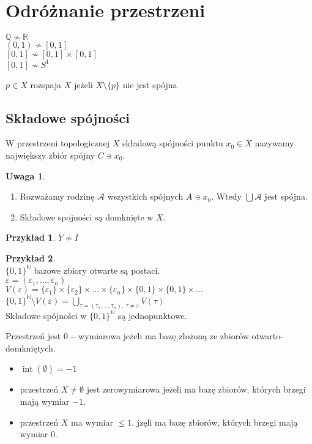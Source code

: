 \documentclass[twoside,10pt]{article}
\theoremstyle{definition}
\theoremstyle{definition}
\theoremstyle{definition}
\theoremstyle{definition}
\theoremstyle{remark}
\theoremstyle{definition}
\newtheorem*{uw}{Uwaga}
\theoremstyle{definition}
\theoremstyle{definition}
\theoremstyle{definition}
\newtheorem*{prz}{Przykład}
\theoremstyle{definition}
\theoremstyle{definition}
\begin{document}
\section{Odróżnanie przestrzeni} 
$\mathbb{Q} \nsim \mathbb{R}$ \\ 
$(0,1) \nsim [0,1]$ \\ 
$[0,1] \nsim [0,1] \times [0,1]$ \\ 
$[0,1] \nsim S^1$ 
\begin{df} 
    $p \in X$ rozspaja $X$ jeżeli $X \setminus \{p\}$ nie jest spójna 
\end{df} 
\subsection{Składowe spójności} 
\begin{df} 
    W przestrzeni topologicznej $X$ składową spójności punktu $x_0 \in X$ nazywamy 
    największy zbiór spójny $C \ni x_0$.
\end{df} 
\begin{uw} \hfill 
    \begin{enumerate}[(1)]
        \item Rozważamy rodzinę $\mathcal A$ wszystkich spójnych $A \ni x_0$. 
        Wtedy $\bigcup \mathcal A$ jest spójna.
        \item Składowe spojności są domknięte w $X$. 
    \end{enumerate}
\end{uw} 
\begin{prz} 
    $Y \nsim I$ 
\end{prz} 
\begin{prz} ~\\ 
    $\{0,1\}^\mathbb N$ bazowe zbiory otwarte są postaci. \\ 
    $\varepsilon = (\varepsilon_1,\ldots,\varepsilon_n)$ \\ 
    $V(\varepsilon) = \{\varepsilon_1\} \times \{\varepsilon_2\} \times \ldots \times 
    \{\varepsilon_n\} \times \{0,1\} \times \{0,1\} \times \ldots$ \\ 
    $\{0,1\}^\mathbb N \setminus V(\varepsilon) = \bigcup\limits_{\tau = 
    (\tau_1,\ldots,\tau_n),\ \tau \neq \varepsilon} V(\tau)$ \\ 
    Składowe spójności w $\{0,1\}^\mathbb N$ są jednopunktowe.
\end{prz} 
\begin{df} 
    Przestrzeń jest $0-$wymiarowa jeżeli ma bazę złożoną ze zbiorów otwarto-domkniętych. 
    \begin{itemize} 
        \item $\operatorname{int}(\emptyset) = -1$ 
        \item przestrzeń $X \neq \emptyset$ jest zerowymiarowa jeżeli ma bazę zbiorów, 
            których brzegi mają wymiar $-1$. 
        \item przestrzeń $X$ ma wymiar $\le 1$, jzęli ma bazę zbiorów, których brzegi mają
            wymiar 0.
    \end{itemize} 
\end{df} 
\end{document}
